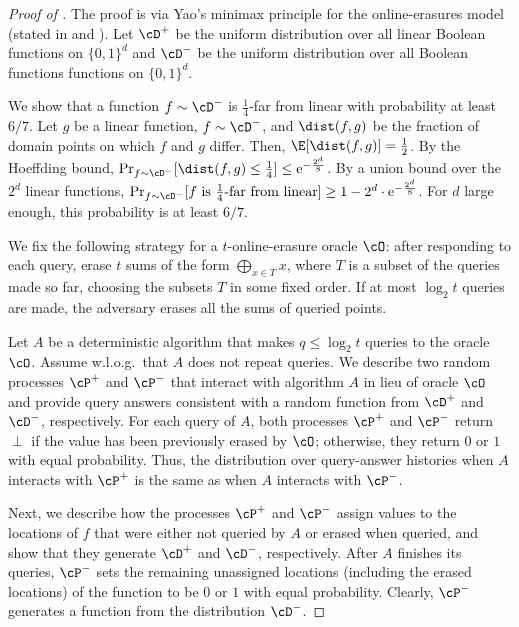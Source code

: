 \documentclass[11pt]{article}
\numberwithin{equation}{section}
\theoremstyle{definition}
\theoremstyle{plain}
\newcommand{\eee}{\mathrm e}
\begin{document}
\begin{proof}[Proof of ] 
The proof is via Yao's minimax principle for the online-erasures model (stated in  and ).  
 Let $\cD^+$ be the uniform distribution over all linear Boolean functions on $\{0,1\}^d$ and  $\cD^{-}$ be the uniform distribution over all Boolean functions functions on $\{0,1\}^d$. 
 
 We show that a function $f \sim \cD^-$ is $\frac 1 4$-far from linear with probability at least $6/7$.
 Let $g$ be a linear function, $f \sim \cD^-$, and $\dist(f,g)$ be the fraction of domain points on which $f$ and $g$ differ. Then, $\E[\dist(f,g)] = \frac{1}{2}$. By the Hoeffding bound, $\Pr_{f\sim \cD^-}[\dist(f,g) \leq \frac{1}{4}] \leq \eee^{-\frac{2^d}{8}}$.
By a union bound over the $2^d$ linear functions, $\Pr_{f\sim \cD^-}[f \text{ is } \frac{1}{4}\textnormal{-far from linear}] \geq 1 - 2^d \cdot \eee^{-\frac{2^d}{8}}$. For $d$ large enough, this probability is at least $6/7$. 
 
We fix the following  strategy for a $t$-online-erasure oracle $\cO$: after responding to each query, erase $t$ sums of the form $\bigoplus_{x \in T}x$, where  $T$ is a subset of the queries made so far, choosing the subsets $T$ in some fixed order.
If at most $\log_2 t$ queries are made, the adversary erases all the sums of queried points.


 
 Let $A$ be a deterministic algorithm that makes $q \leq \log_2 t$ queries to the oracle $\cO$. Assume w.l.o.g.\ that $A$ does not repeat queries. 
 We describe two random processes $\cP^+$ and $\cP^-$ that interact with %
 algorithm $A$ in lieu of oracle $\cO$ and provide query answers consistent with a random function from $\cD^+$ and $\cD^-$, respectively. 
 For each query of $A$, both processes $\cP^+$ and $\cP^-$ return $\perp$ if the value has been previously erased by $\cO$; otherwise, they return $0$ or $1$ with equal probability. Thus, the distribution over query-answer histories when $A$ interacts with $\cP^+$ is the same as when $A$ interacts with $\cP^-$.  
 
Next, we describe how the processes $\cP^+$ and $\cP^-$ assign values to the locations of $f$ that were either not queried by $A$ or erased when queried, and show that they generate $\cD^+$ and $\cD^-$, respectively. 
%
After $A$ finishes its queries, $\cP^-$ sets the remaining unassigned locations (including the erased locations) of the function to be $0$ or $1$ with equal probability.  Clearly, $\cP^-$ generates a function from the distribution $\cD^-$. 
 

\end{proof}
\end{document}
